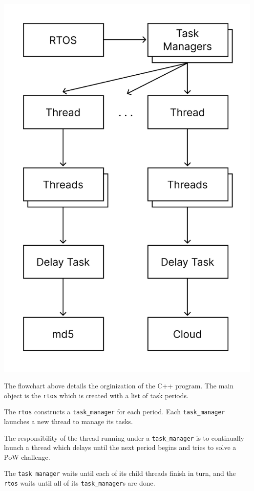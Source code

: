 \documentclass[twoside,twocolumn]{article}
\begin{document}
\begin{center}
  \includegraphics[scale=0.75]{flowchart.png}
\end{center}

The flowchart above details the orginization of the C++ program.
The main object is the \texttt{rtos} which is created with a list of task periods.

The \texttt{rtos} constructs a \texttt{task\_manager} for each period.
Each \texttt{task\_manager} launches a new thread to manage its tasks.

The responsibility of the thread running under a \texttt{task\_manager} is to continually launch a thread which delays until the next period begins and tries to solve a PoW challenge.

The \texttt{task manager} waits until each of its child threads finish in turn, and the \texttt{rtos} waits until all of its \texttt{task\_manager}s are done.
\end{document}
